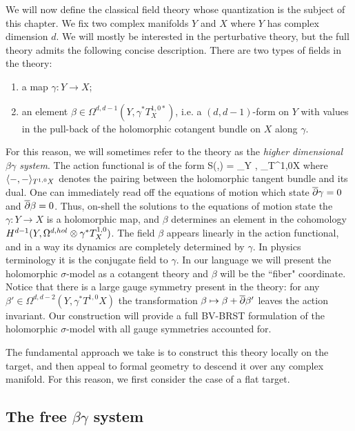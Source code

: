 We will now define the classical field theory whose quantization is the subject of this chapter.
We fix two complex manifolds $Y$ and $X$ where $Y$ has complex dimension $d$. 
We will mostly be interested in the perturbative theory, but the full theory admits the following concise description.
There are two types of fields in the theory:
\begin{enumerate}
\item a map $\gamma : Y \to X$;
\item an element $\beta \in \Omega^{d, d-1} (Y , \gamma^* T^{1,0*}_X)$, i.e. a $(d,d-1)$-form on $Y$ with values in the pull-back of the holomorphic cotangent bundle on $X$ along $\gamma$.
\end{enumerate}
For this reason, we will sometimes refer to the theory as the {\em higher dimensional $\beta\gamma$ system}.
The action functional is of the form 
\ben
S(\beta,\gamma) = \int_Y \<\beta, \dbar \gamma\>_{T^{1,0}X}
\een
where $\langle-,-\rangle_{T^{1,0}X}$ denotes the pairing between the holomorphic tangent bundle and its dual.
One can immediately read off the equations of motion which state $\overline{\partial} \gamma = 0$ and $\overline{\partial} \beta = 0$.
Thus, on-shell the solutions to the equations of motion state the $\gamma : Y \to X$ is a holomorphic map, and $\beta$ determines an element in the cohomology $H^{d-1}(Y , \Omega^{d,hol} \otimes \gamma^* T_X^{1,0})$. 
The field $\beta$ appears linearly in the action functional, and in a way its dynamics are completely determined by $\gamma$. 
In physics terminology it is the conjugate field to $\gamma$. 
In our language we will present the holomorphic $\sigma$-model as a cotangent theory and $\beta$ will be the ``fiber" coordinate. 
Notice that there is a large gauge symmetry present in the theory: for any $\beta' \in \Omega^{d,d-2}(Y , \gamma^*T^{1,0}X)$ the transformation $\beta \mapsto \beta + \overline{\partial} \beta'$ leaves the action invariant. 
Our construction will provide a full BV-BRST formulation of the holomorphic $\sigma$-model with all gauge symmetries accounted for. 

The fundamental approach we take is to construct this theory locally on the target, and then appeal to formal geometry to descend it over any complex manifold.
For this reason, we first consider the case of a flat target.

\subsection{The free $\beta\gamma$ system}

